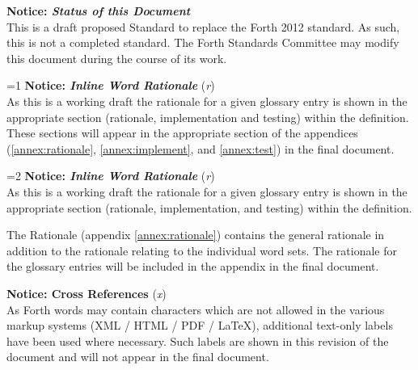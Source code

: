 \begin{titlepage}
\ifrelease\else
\textbf{Notice: \emph{Status of this Document}} \\
This is a draft proposed Standard to replace the Forth 2012 standard.
As such, this is not a completed standard. The Forth Standards Committee
may modify this document during the course of its work.
\fi

%
%

\ifnum\value{part}=1
	\ifinline
\textbf{Notice: \emph{Inline Word Rationale}} (\textit{r}) \\
As this is a working draft the rationale for a given glossary
entry is shown in the appropriate section (rationale,
implementation and testing) within the definition.
These sections will appear in the appropriate section of
the appendices (\ref{annex:rationale}, \ref{annex:implement},
and \ref{annex:test}) in the final document.
	\fi
\fi


%
%

\ifnum\value{part}=2
	\ifinline
\textbf{Notice: \emph{Inline Word Rationale}} (\textit{r}) \\
As this is a working draft the rationale for a given glossary
entry is shown in the appropriate section (rationale,
implementation, and testing) within the definition.

The Rationale (appendix \ref{annex:rationale}) contains the
general rationale in addition to the rationale relating to
the individual word sets.
The rationale for the glossary entries will be included in
the appendix in the final document.
	\fi
\fi


\ifshowref
\textbf{Notice: Cross References} (\textit{x}) \\
As Forth words may contain characters which are not allowed in the
various markup systems (XML / HTML / PDF / \LaTeX), additional
text-only labels have been used where necessary. Such labels are
shown in this revision of the document and will not appear in the
final document.
\fi
\end{titlepage}
